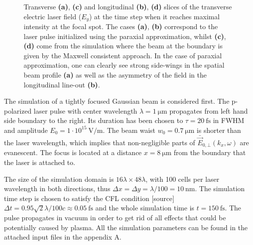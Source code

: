 \begin{figure}[h!]
	\hspace{2mm}
	\caption{Transverse \textbf{(a)}, \textbf{(c)} and longitudinal \textbf{(b)}, \textbf{(d)} slices of the transverse electric laser field ($ E_{y} $) at the time step when it reaches maximal intensity at the focal spot. The cases \textbf{(a)}, \textbf{(b)} correspond to the laser pulse initialized using the paraxial approximation, whilst \textbf{(c)}, \textbf{(d)} come from the simulation where the beam at the boundary is given by the Maxwell consistent approach. In the case of paraxial approximation, one can clearly see strong side-wings in the spatial beam profile \textbf{(a)} as well as the asymmetry of the field in the longitudinal line-out \textbf{(b)}.}
	\label{fig:2}
\end{figure}

The simulation of a tightly focused Gaussian beam is considered first. The p-polarized laser pulse with center wavelength $ \lambda = 1 \ \mathrm{\mu m} $ propagates from left hand side boundary to the right. Its duration has been chosen to $ \tau = 20 \ \mathrm{fs} $ in FWHM and amplitude $ E_0 = 1 \cdot 10^{15} \ \mathrm{V/m} $. The beam waist $ w_0 = 0.7 \ \mathrm{\mu m} $ is shorter than the laser wavelength, which implies that non-negligible parts of $ \bar{\vec{E}}_{0, \bot}(k_x, \omega) $ are evanescent. The focus is located at a distance $ x = 8 \ \mathrm{\mu m} $ from the boundary that the laser is attached to.

The size of the simulation domain is $ 16 \lambda \times 48 \lambda $, with 100 cells per laser wavelength in both directions, thus $ \Delta x = \Delta y = \lambda/100 = 10 \ \mathrm{nm} $. The simulation time step is chosen to satisfy the CFL condition [source] $ \Delta t = 0.95 \sqrt{2} \lambda/ 100 c \approx 0.05 \ \mathrm{fs} $ and the whole simulation time is $ t = 150 \ \mathrm{fs} $. The pulse propagates in vacuum in order to get rid of all effects that could be potentially caused by plasma. All the simulation parameters can be found in the attached input files in the appendix A.

